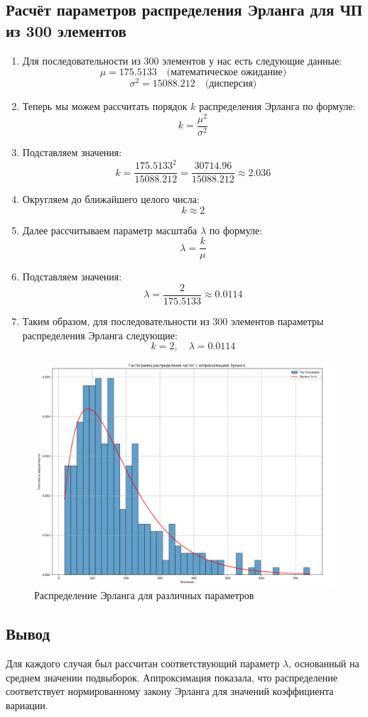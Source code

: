 \subsection{Расчёт параметров распределения Эрланга для ЧП из 300 элементов}

\begin{enumerate}
	\item Для последовательности из 300 элементов у нас есть следующие данные:
	      \[
		      \mu = 175.5133 \quad \text{(математическое ожидание)}
	      \]
	      \[
		      \sigma^2 = 15088.212 \quad \text{(дисперсия)}
	      \]

	\item Теперь мы можем рассчитать порядок \(k\) распределения Эрланга по формуле:
	      \[
		      k = \frac{\mu^2}{\sigma^2}
	      \]
	\item Подставляем значения:
	      \[
		      k = \frac{175.5133^2}{15088.212} = \frac{30714.96}{15088.212} \approx 2.036
	      \]
	\item Округляем до ближайшего целого числа:
	      \[
		      k \approx 2
	      \]

	\item Далее рассчитываем параметр масштаба \( \lambda \) по формуле:
	      \[
		      \lambda = \frac{k}{\mu}
	      \]
	\item Подставляем значения:
	      \[
		      \lambda = \frac{2}{175.5133} \approx 0.0114
	      \]

	\item Таким образом, для последовательности из 300 элементов параметры распределения Эрланга следующие:
	      \[
		      k = 2, \quad \lambda = 0.0114
	      \]

\end{enumerate}


\FloatBarrier
\begin{figure}[h]
	\centering
	\includegraphics[width=1\textwidth]{../data/histogram_approximated.png}
	\caption{Распределение Эрланга для различных параметров}
\end{figure}
\FloatBarrier

\subsection{Вывод}

Для каждого случая был рассчитан соответствующий параметр \(\lambda\), основанный на среднем значении подвыборок. Аппроксимация показала, что распределение соответствует нормированному закону Эрланга для значений коэффициента вариации.
